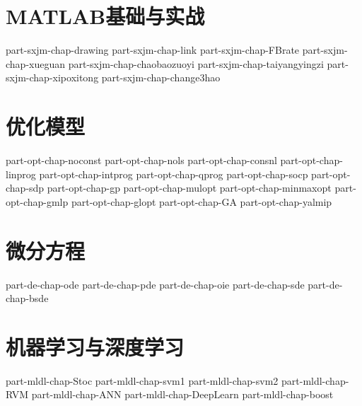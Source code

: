 \documentclass[UTF8]{ctexbook}
\begin{document}






\tableofcontents %

\clearpage
{} %

\part{MATLAB基础与实战}
{part-sxjm-chap-drawing}
{part-sxjm-chap-link}
{part-sxjm-chap-FBrate}
{part-sxjm-chap-xueguan}
{part-sxjm-chap-chaobaozuoyi}
{part-sxjm-chap-taiyangyingzi}
{part-sxjm-chap-xipoxitong}
{part-sxjm-chap-change3hao}
\part{优化模型}
{part-opt-chap-noconst}
{part-opt-chap-nols}
{part-opt-chap-consnl}
{part-opt-chap-linprog}
{part-opt-chap-intprog}
{part-opt-chap-qprog}
{part-opt-chap-socp}
{part-opt-chap-sdp}
{part-opt-chap-gp}
{part-opt-chap-mulopt}
{part-opt-chap-minmaxopt}
{part-opt-chap-gmlp}
{part-opt-chap-glopt}
{part-opt-chap-GA}
{part-opt-chap-yalmip}
\part{微分方程}
{part-de-chap-ode}
{part-de-chap-pde}
{part-de-chap-oie}
{part-de-chap-sde}
{part-de-chap-bsde}
\part{机器学习与深度学习}
{part-mldl-chap-Stoc}
{part-mldl-chap-svm1}
{part-mldl-chap-svm2}
{part-mldl-chap-RVM}
{part-mldl-chap-ANN}
{part-mldl-chap-DeepLearn}
{part-mldl-chap-boost}





\end{document}
